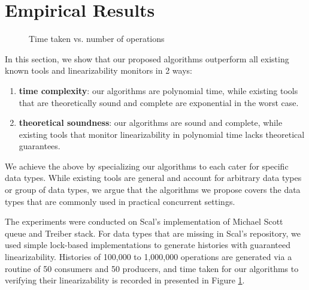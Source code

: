 
\section{Empirical Results}

\begin{figure}
\caption{Time taken vs. number of operations}
\label{graph-oper}
\end{figure}

In this section, we show that our proposed algorithms outperform all existing known tools and linearizability monitors in 2 ways:

\begin{enumerate}
    \item \textbf{time complexity}: our algorithms are polynomial time, while existing tools that are theoretically sound and complete are exponential in the worst case.
    \item \textbf{theoretical soundness}: our algorithms are sound and complete, while existing tools that monitor linearizability in polynomial time lacks theoretical guarantees.
\end{enumerate}

We achieve the above by specializing our algorithms to each cater for specific data types. While existing tools are general and account for arbitrary data types or group of data types, we argue that the algorithms we propose covers the data types that are commonly used in practical concurrent settings.

The experiments were conducted on Scal's implementation of Michael Scott queue and Treiber stack. For data types that are missing in Scal's repository, we used simple lock-based implementations to generate histories with guaranteed linearizability. Histories of 100,000 to 1,000,000 operations are generated via a routine of 50 consumers and 50 producers, and time taken for our algorithms to verifying their linearizability is recorded in presented in Figure \ref{graph-oper}.

